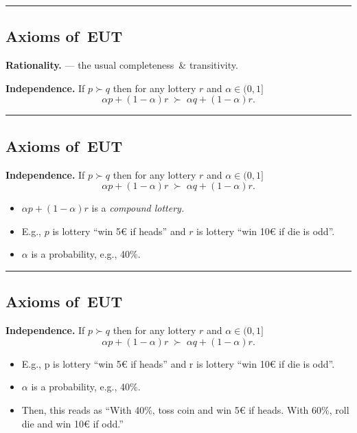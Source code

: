 \documentclass[
  letterpaper,
  DIV=11,
  numbers=noendperiod]{scrartcl}
\providecommand{\tightlist}{%
  \setlength{\itemsep}{0pt}\setlength{\parskip}{0pt}}\usepackage{longtable,booktabs,array}
\begin{document}
\begin{center}\rule{0.5\linewidth}{0.5pt}\end{center}

\subsection{Axioms of~EUT}\label{axioms-of-eut}

\label{ax:rational}
\textbf{Rationality.} --- the usual completeness~\& transitivity.

\label{ax:independence}
\textbf{Independence.} If \(p \succ q\) then for any lottery \(r\) and
\(\alpha\in(0,1]\)
\[\alpha p+(1-\alpha)r \;\succ\; \alpha q+(1-\alpha)r.\]

\begin{center}\rule{0.5\linewidth}{0.5pt}\end{center}

\subsection{Axioms of~EUT}\label{axioms-of-eut-1}

\label{ax:independence}
\textbf{Independence.} If \(p \succ q\) then for any lottery \(r\) and
\(\alpha\in(0,1]\)
\[\alpha p+(1-\alpha)r \;\succ\; \alpha q+(1-\alpha)r.\]

\begin{itemize}
\tightlist
\item
  \(\alpha p+(1-\alpha)r\) is a \emph{compound lottery.}
\item
  E.g., \(p\) is lottery ``win 5€ if heads'' and \(r\) is lottery ``win
  10€ if die is odd''.
\item
  \(\alpha\) is a probability, e.g., 40\%.
\end{itemize}

\begin{center}\rule{0.5\linewidth}{0.5pt}\end{center}

\subsection{Axioms of~EUT}\label{axioms-of-eut-2}

\label{ax:independence}
\textbf{Independence.} If \(p \succ q\) then for any lottery \(r\) and
\(\alpha\in(0,1]\)
\[\alpha p+(1-\alpha)r \;\succ\; \alpha q+(1-\alpha)r.\]

\begin{itemize}
\tightlist
\item
  E.g., p is lottery ``win 5€ if heads'' and r is lottery ``win 10€ if
  die is odd''.
\item
  \(\alpha\) is a probability, e.g., 40\%.
\item
  Then, this reads as ``With 40\%, toss coin and win 5€ if heads. With
  60\%, roll die and win 10€ if odd.''
\end{itemize}
\end{document}

